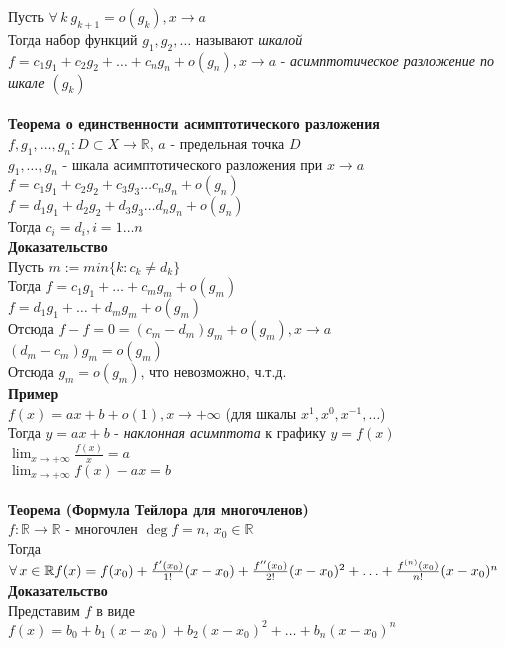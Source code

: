 \documentclass[12pt]{article}
\begin{document}
Пусть $\forall\,k\ g_{k+1}=o(g_k), x\rightarrow a$\\
Тогда набор функций $g_1,g_2,\ldots$ называют \textit{шкалой}\\
$f = c_1g_1+c_2g_2+\ldots+c_ng_n+o(g_n), x\rightarrow a$ - \textit{асимптотическое разложение по шкале $(g_k)$}\\\\
\textbf{Теорема о единственности асимптотического разложения}\\
$f,g_1,\ldots,g_n:D\subset X \rightarrow \mathbb{R}$, $a$ - предельная точка $D$\\
$g_1,\ldots,g_n$ - шкала асимптотического разложения при $x\rightarrow a$\\
$f = c_1g_1+c_2g_2+c_3g_3\ldots c_ng_n+o(g_n)$\\
$f = d_1g_1+d_2g_2+d_3g_3\ldots d_ng_n+o(g_n)$\\
Тогда $c_i = d_i, i = 1\ldots n$\\
\textbf{Доказательство}\\
Пусть $m := min\{k: c_k \neq d_k\}$\\
Тогда $f=c_1g_1+\ldots+c_mg_m+o(g_m)$\\
$f=d_1g_1+\ldots+d_mg_m+o(g_m)$\\
Отсюда $f-f=0=(c_m-d_m)g_m+o(g_m), x\rightarrow a$\\
$(d_m-c_m)g_m = o(g_m)$\\
Отсюда  $g_m = o(g_m)$, что невозможно, ч.т.д.\\
\textbf{Пример}\\
$f(x) = ax+b+o(1), x\rightarrow +\infty$ (для шкалы $x^1,x^0,x^{-1},\ldots$)\\
Тогда $y=ax+b$ - \textit{наклонная асимптота} к графику $y=f(x)$\\
$\lim_{x\rightarrow+\infty}\frac{f(x)}{x} = a$\\
$\lim_{x\rightarrow+\infty} f(x)-ax = b$\\\\
\textbf{Теорема (Формула Тейлора для многочленов)}\\
$f:\mathbb{R}\rightarrow\mathbb{R}$ - многочлен $\deg f = n$, $x_0\in \mathbb{R}$\\
Тогда $\forall\,x\in\mathbb{R}\\f(x)=f(x_0)+\frac{f'(x_0)}{1!}(x-x_0)+\frac{f''(x_0)}{2!}(x-x_0)^2+\ldots+\frac{f^{(n)}(x_0)}{n!}(x-x_0)^n$\\
\textbf{Доказательство}\\
Представим $f$ в виде $f(x)=b_0+b_1(x-x_0)+b_2(x-x_0)^2+\ldots+b_n(x-x_0)^n$\\
\end{document}
